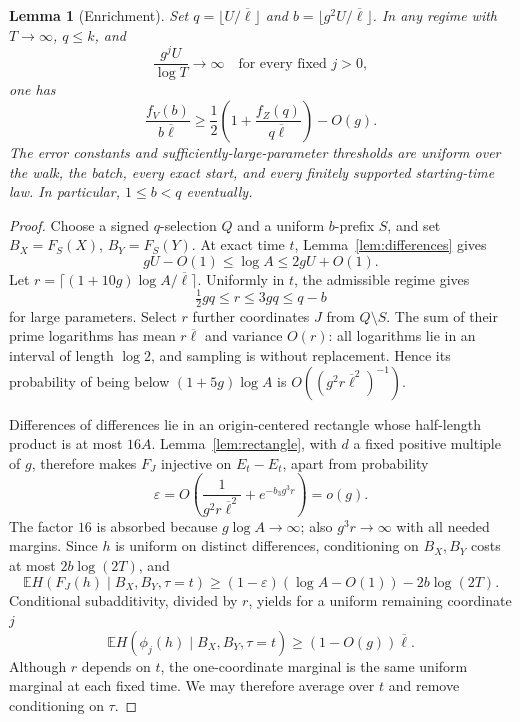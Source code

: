 \documentclass[11pt]{article}
\numberwithin{equation}{section}
\newtheorem{lemma}[theorem]{Lemma}
\theoremstyle{definition}\newtheorem{definition}[theorem]{Definition}
\theoremstyle{remark}\newtheorem{remark}[theorem]{Remark}
\newcommand{\E}{\mathbb E}\newcommand{\Prob}{\mathbb P}
\newcommand{\Lb}{\overline{\ell}}
\begin{document}
\begin{lemma}[Enrichment]\label{lem:enrichment}
Set $q=\lfloor U/\Lb\rfloor$ and $b=\lfloor g^2U/\Lb\rfloor$. In any regime with $T\to\infty$, $q\le k$, and
\[
 \frac{g^jU}{\log T}\longrightarrow\infty
 \quad\text{for every fixed }j>0,
\]
one has
\begin{equation}\label{eq:enrich}
 \frac{f_V(b)}{b\Lb}\ge
 \frac12\left(1+\frac{f_Z(q)}{q\Lb}\right)-O(g).
\end{equation}
The error constants and sufficiently-large-parameter thresholds are uniform over the walk, the batch, every exact start, and every finitely supported starting-time law. In particular, $1\le b<q$ eventually.
\end{lemma}
\begin{proof}
Choose a signed $q$-selection $Q$ and a uniform $b$-prefix $S$, and set $B_X=F_S(X)$, $B_Y=F_S(Y)$. At exact time $t$, Lemma~\ref{lem:differences} gives
\[
 gU-O(1)\le\log A\le2gU+O(1).
\]
Let $r=\lceil(1+10g)\log A/\Lb\rceil$. Uniformly in $t$, the admissible regime gives
\[
 \tfrac12gq\le r\le3gq\le q-b
\]
for large parameters. Select $r$ further coordinates $J$ from $Q\setminus S$. The sum of their prime logarithms has mean $r\Lb$ and variance $O(r)$: all logarithms lie in an interval of length $\log2$, and sampling is without replacement. Hence its probability of being below $(1+5g)\log A$ is $O((g^2r\Lb^2)^{-1})$.

Differences of differences lie in an origin-centered rectangle whose half-length product is at most $16A$. Lemma~\ref{lem:rectangle}, with $d$ a fixed positive multiple of $g$, therefore makes $F_J$ injective on $E_t-E_t$, apart from probability
\[
 \varepsilon=O\left(\frac1{g^2r\Lb^2}+e^{-b_3g^3r}\right)=o(g).
\]
The factor $16$ is absorbed because $g\log A\to\infty$; also $g^3r\to\infty$ with all needed margins. Since $h$ is uniform on distinct differences, conditioning on $B_X,B_Y$ costs at most $2b\log(2T)$, and
\[
 \E H(F_J(h)\mid B_X,B_Y,\tau=t)
 \ge(1-\varepsilon)(\log A-O(1))-2b\log(2T).
\]
Conditional subadditivity, divided by $r$, yields for a uniform remaining coordinate $j$
\begin{equation}\label{eq:onecoordinate}
 \E H(\phi_j(h)\mid B_X,B_Y,\tau=t)\ge(1-O(g))\Lb.
\end{equation}
Although $r$ depends on $t$, the one-coordinate marginal is the same uniform marginal at each fixed time. We may therefore average over $t$ and remove conditioning on $\tau$.


\end{proof}
\end{document}
